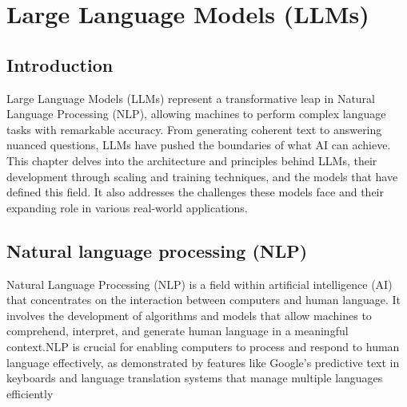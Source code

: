 \chapter{Large Language Models (LLMs)}
\pagestyle{fancy}
\pagestyle{fancy}\chead{} \pagestyle{fancy}\rhead{}
\pagestyle{fancy} 
\pagestyle{fancy}\cfoot{} \pagestyle{fancy}\rfoot{\thepage}
\section{Introduction} \label{start1}
Large Language Models (LLMs) represent a transformative leap in Natural Language Processing (NLP), allowing machines to perform complex language tasks with remarkable accuracy. From generating coherent text to answering nuanced questions, LLMs have pushed the boundaries of what AI can achieve. This chapter delves into the architecture and principles behind LLMs, their development through scaling and training techniques, and the models that have defined this field. It also addresses the challenges these models face and their expanding role in various real-world applications. 

\section{Natural language processing (NLP)}
Natural Language Processing (NLP) is a field within artificial intelligence (AI) that concentrates on the interaction between computers and human language. It involves the development of algorithms and models  that allow machines to comprehend, interpret, and generate human language in a meaningful context.NLP is crucial for enabling computers to process and respond to human language effectively, as demonstrated by features like Google's predictive text in keyboards and language translation systems that manage multiple languages efficiently \cite{murugan2024nlp}

